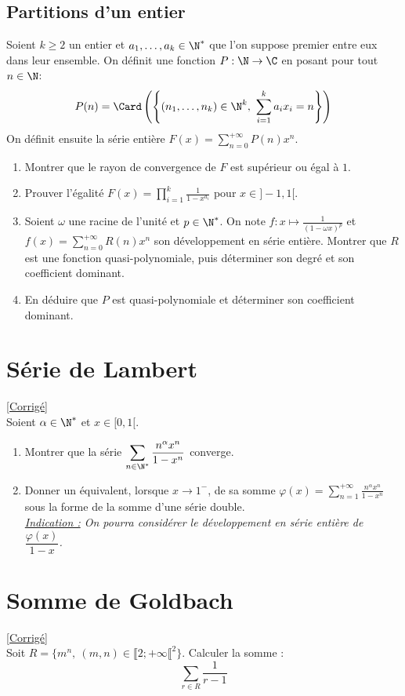 \documentclass{book}
\begin{document}
\subsection{Partitions d'un entier}
\label{Partitions d'un entier}
Soient $k\geq 2$ un entier et $a_1,\dots,a_k\in \N^*$ que l'on suppose premier entre eux dans leur ensemble. On définit une fonction $P:\N\to \C$ en posant pour tout $n\in \N$:
$$P(n)=\Card\left(\left\{(n_1,\dots,n_k)\in \N^k,\ \sum_{i=1}^ka_ix_i=n\right\}\right)$$
On définit ensuite la série entière $F(x)=\displaystyle\sum_{n=0}^{+\infty}P(n)x^n$.
\begin{enumerate}
	\item Montrer que le rayon de convergence de $F$ est supérieur ou égal à $1$.
	\item Prouver l'égalité $F(x)=\displaystyle\prod_{i=1}^k\frac{1}{1-x^{a_i}}$ pour $x\in ]-1,1[$.
	\item Soient $\omega$ une racine de l'unité et $p\in \N^*$. On note $f:x\mapsto \displaystyle\frac{1}{(1-\omega x)^p}$ et $f(x)=\displaystyle\sum_{n=0}^{+\infty}R(n)x^n$ son développement en série entière. Montrer que $R$ est une fonction quasi-polynomiale, puis déterminer son degré et son coefficient dominant.
	\item En déduire que $P$ est quasi-polynomiale et déterminer son coefficient dominant.
\end{enumerate}

\section{Série de Lambert}
\label{Série de Lambert}
\textcolor{blue}{\hyperref[sec:serie-de-lambert]{[Corrigé]}}\\
Soient $\alpha\in \N^*$ et $x\in [0,1[$.
\begin{enumerate}
	\item Montrer que la série $\displaystyle\sum_{n\in \N^*}\frac{n^\alpha x^n}{1-x^n}$ converge.
	\item Donner un équivalent, lorsque $x\to 1^-$, de sa somme $\varphi(x)=\displaystyle\sum_{n=1}^{+\infty}\frac{n^\alpha x^n}{1-x^n}$ sous la forme de la somme d'une série double.\\
	\textit{\underline{Indication :} On pourra considérer le développement en série entière de $\dfrac{\varphi(x)}{1-x}$.}
\end{enumerate}

\section{Somme de Goldbach}
\label{Somme de Goldbach}
\textcolor{blue}{\hyperref[sec:somme-de-goldbach]{[Corrigé]}}\\
Soit $R=\{m^n,\ (m,n)\in {\llbracket 2;+\infty\llbracket}^2\}$. Calculer la somme :
$$\sum_{r\in R}\frac{1}{r-1}$$
\end{document}
